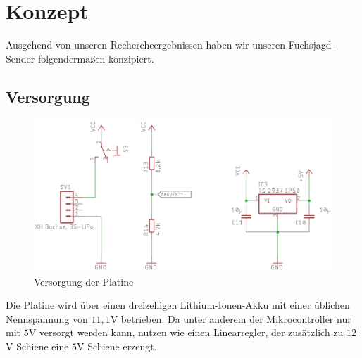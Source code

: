 \section{Konzept}
Ausgehend von unseren Rechercheergebnissen haben wir unseren Fuchsjagd-Sender
folgendermaßen konzipiert.
\subsection{Versorgung}
\begin{figure}[H]
    \centering
    \includegraphics{res/Versorgung.png}
    \caption{Versorgung der Platine}
\end{figure}
Die Platine wird über einen dreizelligen Lithium-Ionen-Akku mit einer üblichen Nennspannung
von $11,1$V betrieben. Da unter anderem der Mikrocontroller nur mit $5$V versorgt
werden kann, nutzen wie einen Linearregler, der zusätzlich zu $12$V Schiene eine
$5$V Schiene erzeugt.